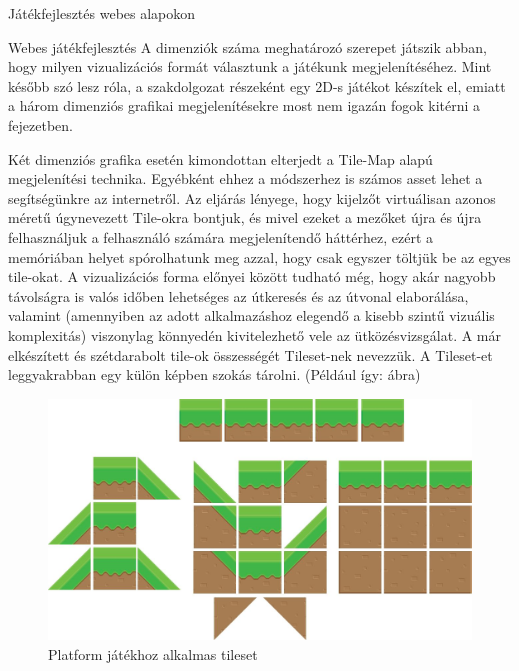 \begin{MyChapter}{Játékfejlesztés webes alapokon}
\begin{MySection}{Webes játékfejlesztés}
		A dimenziók száma meghatározó szerepet játszik abban, hogy milyen vizualizációs formát választunk a játékunk megjelenítéséhez. Mint később szó lesz róla, a szakdolgozat részeként egy 2D-s játékot készítek el, emiatt a három dimenziós grafikai megjelenítésekre most nem igazán fogok kitérni a fejezetben.
		
		Két dimenziós grafika esetén kimondottan elterjedt a Tile-Map alapú megjelenítési technika. Egyébként ehhez a módszerhez is számos asset lehet a segítségünkre az internetről. Az eljárás lényege, hogy kijelzőt virtuálisan azonos méretű úgynevezett Tile-okra bontjuk, és mivel ezeket a mezőket újra és újra felhasználjuk a felhasználó számára megjelenítendő háttérhez, ezért a memóriában helyet spórolhatunk meg azzal, hogy csak egyszer töltjük be az egyes tile-okat. A vizualizációs forma előnyei között tudható még, hogy akár nagyobb távolságra is valós időben lehetséges az útkeresés és az útvonal elaborálása, valamint (amennyiben az adott alkalmazáshoz elegendő a kisebb szintű vizuális komplexitás) viszonylag könnyedén kivitelezhető vele az ütközésvizsgálat.
		A már elkészített és szétdarabolt tile-ok összességét Tileset-nek nevezzük. A Tileset-et leggyakrabban egy külön képben szokás tárolni. (Például így:  ábra)
		\begin{figure}[H]
			\centering
			\includegraphics[scale=0.25]{kepek/tileMap/TileSet.png}
			\caption{Platform játékhoz alkalmas tileset}
			\label{fig:tileMap:tileSet}
		\end{figure}
	

\end{MySection}
\end{MyChapter}
